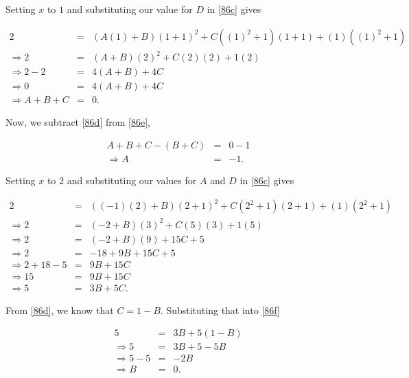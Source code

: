 Setting $x$ to $1$ and substituting our value for $D$ in \ref{86c} gives

\begin{eqnarray}
	2&=&\left(A\left(1\right)+B\right)\left(1+1\right)^2+C\left(\left(1\right)^2+1\right)\left(1+1\right)+\left(1\right)\left(\left(1\right)^2+1\right)\nonumber\\
    \Rightarrow2&=&\left(A+B\right)\left(2\right)^2+C\left(2\right)\left(2\right)+1\left(2\right)\nonumber\\
    \Rightarrow2-2&=&4\left(A+B\right)+4C\nonumber\\
    \Rightarrow0&=&4\left(A+B\right)+4C\nonumber\\
    \Rightarrow A+B+C&=&0.\label{86e}
\end{eqnarray}

Now, we subtract \ref{86d} from \ref{86e},

\begin{eqnarray*}
    A+B+C-\left(B+C\right)&=&0-1\\
    \Rightarrow A&=&-1.
\end{eqnarray*}

Setting $x$ to $2$ and substituting our values for $A$ and $D$ in \ref{86c} gives

\begin{eqnarray}
	2&=&\left(\left(-1\right)\left(2\right)+B\right)\left(2+1\right)^2+C\left(2^2+1\right)\left(2+1\right)+\left(1\right)\left(2^2+1\right)\nonumber\\
    \Rightarrow2&=&\left(-2+B\right)\left(3\right)^2+C\left(5\right)\left(3\right)+1\left(5\right)\nonumber\\
    \Rightarrow2&=&\left(-2+B\right)\left(9\right)+15C+5\nonumber\\
    \Rightarrow2&=&-18+9B+15C+5\nonumber\\
    \Rightarrow2+18-5&=&9B+15C\nonumber\\
    \Rightarrow15&=&9B+15C\nonumber\\
    \Rightarrow5&=&3B+5C.\label{86f}
\end{eqnarray}

From \ref{86d}, we know that $C=1-B$. Substituting that into \ref{86f}

\begin{eqnarray*}
    5&=&3B+5\left(1-B\right)\\
    \Rightarrow5&=&3B+5-5B\\
    \Rightarrow5-5&=&-2B\\
    \Rightarrow B&=&0.
\end{eqnarray*}

